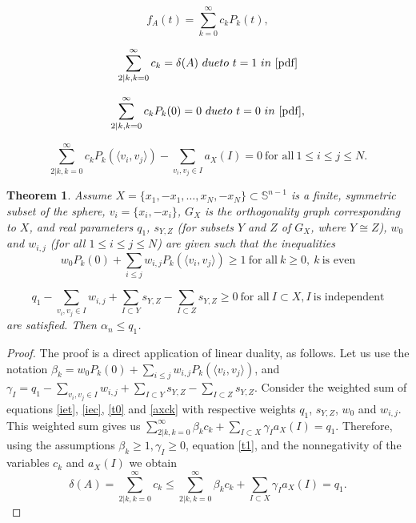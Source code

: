 \documentclass[10pt,a4paper]{amsart}
\newtheorem{theorem}{Theorem}
\newcommand{\Sp}{\mathbb S}
\begin{document}
\begin{equation}\label{pdf}
f_A(t)=\sum_{k=0}^\infty c_kP_k(t),  
\end{equation}

\begin{equation}\label{t1}
\sum_{2|k, k=0}^\infty c_k=\delta(A)  \ {\textrm{due to}} \ t=1 \ {\textrm{in}} \ \eqref{pdf}   
\end{equation}

\begin{equation}\label{t0}
\sum_{2|k, k=0}^\infty c_kP_k(0)=0  \ {\textrm{due to}} \ t=0 \ {\textrm{in}} \ \eqref{pdf},  
\end{equation}

\begin{equation}\label{axck}
\sum_{2|k, k=0}^\infty c_kP_k(\langle v_i, v_j \rangle) - \sum_{v_i,v_j\in I} a_X(I) =0 \ {\textrm{for all}} \ 1\le i\le j\le N.
\end{equation}

\begin{theorem}\label{bound}
Assume $X=\{x_1, -x_1, \dots, x_N, -x_N\}\subset \Sp^{n-1}$ is a finite, symmetric subset of the sphere, $v_i=\{x_i, -x_i\}$, $G_X$ is the orthogonality graph corresponding to $X$, and real parameters $q_1$, $s_{Y,Z}$ (for subsets $Y$ and $Z$ of $G_X$, where $Y\cong Z$), $w_0$ and $w_{i,j}$ (for all $1\le i\le j\le N$)  are given such that the inequalities 
\begin{equation}\label{forck}
w_0P_k(0) + \sum_{i\le j}w_{i,j}P_k(\langle v_i, v_j \rangle )\ge 1 \ {\textrm{for all}} \ k\ge 0, \ k \  {\textrm{is even}} 
\end{equation}

\begin{equation}\label{forax}
q_1 - \sum_{v_i, v_j\in I}w_{i,j} + \sum_{I\subset Y}s_{Y,Z} -\sum_{I\subset Z}s_{Y,Z}\ge 0 \ {\textrm{for all}} \ I\subset X, I \  {\textrm{is independent}}
\end{equation}
are satisfied. Then $\alpha_n\le q_1$.    
\end{theorem}

\begin{proof}
The proof is a direct application of linear duality, as follows. Let us use the notation 
$\beta_k=w_0P_k(0)+\sum_{i\le j}w_{i,j}P_k(\langle v_i, v_j \rangle )$, and $\gamma_I=q_1 - \sum_{v_i, v_j\in I}w_{i,j} + \sum_{I\subset Y}s_{Y,Z} -\sum_{I\subset Z}s_{Y,Z}$. Consider the weighted sum of equations \eqref{iet}, \eqref{iec}, \eqref{t0} and \eqref{axck} with respective weights $q_1$, $s_{Y,Z}$, $w_0$ and $w_{i,j}$. This weighted sum gives us $\sum_{2|k, k=0}^\infty \beta_k c_k +\sum_{I\subset X}\gamma_Ia_X(I)= q_1$. Therefore, using the assumptions $\beta_k\ge 1, \gamma_I\ge 0$, equation \eqref{t1}, and the nonnegativity of the variables $c_k$ and  $a_X(I)$ we obtain 
\begin{equation}\label{last}
\delta(A)=\sum_{2|k, k=0}^\infty  c_k \le \sum_{2|k, k=0}^\infty \beta_k c_k +\sum_{I\subset X}\gamma_Ia_X(I) =q_1.       
\end{equation}
\end{proof}
\end{document}
